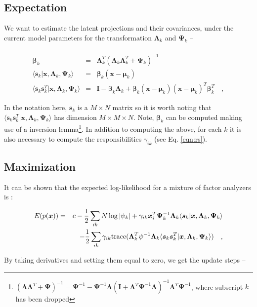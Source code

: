 \documentclass[letterpaper,12pt]{article}
\newcommand{\vect}[1]{\boldsymbol{#1}}
\newcommand{\data}{\vect{x}}
\newcommand{\latent}{\vect{s}}
\newcommand{\mean}{\vect{\mu}}
\newcommand{\eye}{\vect{I}}
\newcommand{\bta}{\vect{\beta}}
\newcommand{\lmda}{\vect{\Lambda}}
\newcommand{\ps}{\vect{\Psi}}
\begin{document}
\subsection{Expectation}

We want to estimate the latent projections and their covariances, under the current model 
parameters for the transformation $\lmda_k$ and $\ps_k$ -- \\ \\

\begin{eqnarray}\displaystyle
\bta_k & = & \lmda_k^T(\lmda_k\lmda_k^T+\ps_k)^{-1}\\
\langle\latent_k|\data,\lmda_k,\ps_k\rangle & = & \bta_k (\data-\mean_k) \\
\langle\latent_k\latent_k^T|\data,\lmda_k,\ps_k\rangle & = & \eye -  \bta_k\lmda_k + \bta_k(\data-\mean_k)(\data-\mean_k)^T\bta_k^T
\quad ,
\end{eqnarray}

In the notation here, $\latent_k$ is a $M\times N$ matrix so it is worth noting that 
$\langle\latent_k\latent_k^T|\data,\lmda_k,\ps_k\rangle $ has dimension $M \times M \times N$.  
Note, $\bta_k$ can be computed making use of a inversion lemma\footnote{
$(\lmda\lmda^T+\ps)^{-1} = \ps^{-1} - \ps^{-1}\lmda(\eye + \lmda^T\ps^{-1}\lmda)^{-1}
\lmda^T\ps^{-1}$, where subscript $k$ has been dropped}.  In addition to computing the 
above, for each $k$ it is also necessary to compute the responsibilities $\gamma_{ik}$ 
(see Eq. \ref{eqn:rs}).

\subsection{Maximization}

It can be shown \citep[for instance,][]{ghahramani96} that the expected log-likelihood for a mixture 
of factor analyzers is :

\begin{eqnarray}\displaystyle
E(p(\data)) &=& c - \frac{1}{2}\sum_{ik} N\log|\psi_k| + \gamma_{ik}\data_i^T\ps_k^{-1}\lmda_k \langle\latent_k|\data,\lmda_k,\ps_k\rangle \\
&& - \frac{1}{2}\sum_{ik} \gamma_{ik}{\rm trace}(\lmda_k^T\psi^{-1}\lmda_k \langle\latent_k\latent_k^T|\data,\lmda_k,\ps_k\rangle )
\quad ,
\end{eqnarray}

By taking derivatives and setting them equal to zero, we get the update steps --
\end{document}
